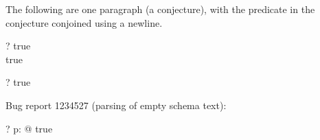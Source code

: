 The following are one paragraph (a conjecture), with the predicate in
the conjecture conjoined using a newline.

\begin{zed}
  \vdash? true \\ true
\end{zed}

\begin{zed}
  \vdash? true \\ [X, Y : \nat]
\end{zed}

Bug report 1234527 (parsing of empty schema text):

\begin{zed}
  \vdash? \forall p: \power [ ] @ true
\end{zed}
